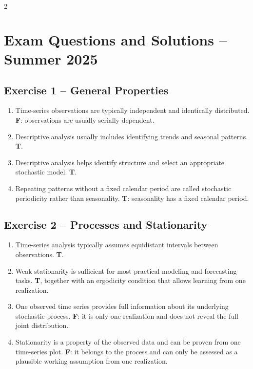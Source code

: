 \documentclass[9pt,a4paper]{extarticle}
\begin{document}
\begin{multicols}{2}
\section{Exam Questions and Solutions -- Summer 2025}

\subsection*{Exercise 1 -- General Properties}
\begin{enumerate}[label=\alph*),leftmargin=4mm]
\item Time-series observations are typically independent and identically distributed. \textbf{F}: observations are usually serially dependent.
\item Descriptive analysis usually includes identifying trends and seasonal patterns. \textbf{T}.
\item Descriptive analysis helps identify structure and select an appropriate stochastic model. \textbf{T}.
\item Repeating patterns without a fixed calendar period are called stochastic periodicity rather than seasonality. \textbf{T}: seasonality has a fixed calendar period.
\end{enumerate}

\subsection*{Exercise 2 -- Processes and Stationarity}
\begin{enumerate}[label=\alph*),leftmargin=4mm]
\item Time-series analysis typically assumes equidistant intervals between observations. \textbf{T}.
\item Weak stationarity is sufficient for most practical modeling and forecasting tasks. \textbf{T}, together with an ergodicity condition that allows learning from one realization.
\item One observed time series provides full information about its underlying stochastic process. \textbf{F}: it is only one realization and does not reveal the full joint distribution.
\item Stationarity is a property of the observed data and can be proven from one time-series plot. \textbf{F}: it belongs to the process and can only be assessed as a plausible working assumption from one realization.
\end{enumerate}


\end{multicols}
\end{document}

